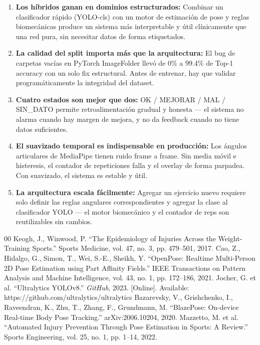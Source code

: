 \documentclass[conference]{IEEEtran}
\begin{document}
\begin{enumerate}
    \item \textbf{Los híbridos ganan en dominios estructurados:} Combinar un clasificador rápido (YOLO-cls) con un motor de estimación de pose y reglas biomecánicas produce un sistema más interpretable y útil clínicamente que una red pura, sin necesitar datos de forma etiquetados.
    \item \textbf{La calidad del split importa más que la arquitectura:} El bug de carpetas vacías en PyTorch ImageFolder llevó de 0\% a 99.4\% de Top-1 accuracy con un solo fix estructural. Antes de entrenar, hay que validar programáticamente la integridad del dataset.
    \item \textbf{Cuatro estados son mejor que dos:} OK / MEJORAR / MAL / SIN\_DATO permite retroalimentación gradual y honesta — el sistema no alarma cuando hay margen de mejora, y no da feedback cuando no tiene datos suficientes.
    \item \textbf{El suavizado temporal es indispensable en producción:} Los ángulos articulares de MediaPipe tienen ruido frame a frame. Sin media móvil e histeresis, el contador de repeticiones falla y el overlay de forma parpadea. Con suavizado, el sistema es estable y útil.
    \item \textbf{La arquitectura escala fácilmente:} Agregar un ejercicio nuevo requiere solo definir las reglas angulares correspondientes y agregar la clase al clasificador YOLO — el motor biomecánico y el contador de reps son reutilizables sin cambios.
\end{enumerate}

\begin{thebibliography}{00}
 Keogh, J., Winwood, P. ``The Epidemiology of Injuries Across the Weight-Training Sports.'' Sports Medicine, vol. 47, no. 3, pp. 479--501, 2017.
 Cao, Z., Hidalgo, G., Simon, T., Wei, S.-E., Sheikh, Y. ``OpenPose: Realtime Multi-Person 2D Pose Estimation using Part Affinity Fields.'' IEEE Transactions on Pattern Analysis and Machine Intelligence, vol. 43, no. 1, pp. 172--186, 2021.
 Jocher, G. et al. ``Ultralytics YOLOv8.'' \textit{GitHub}, 2023. [Online]. Available: https://github.com/ultralytics/ultralytics
 Bazarevsky, V., Grishchenko, I., Raveendran, K., Zhu, T., Zhang, F., Grundmann, M. ``BlazePose: On-device Real-time Body Pose Tracking.'' arXiv:2006.10204, 2020.
 Mazzetto, M. et al. ``Automated Injury Prevention Through Pose Estimation in Sports: A Review.'' Sports Engineering, vol. 25, no. 1, pp. 1--14, 2022.
\end{thebibliography}
\end{document}
